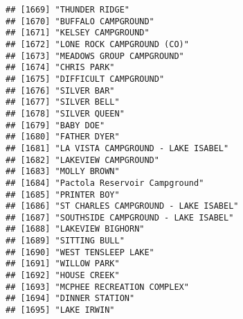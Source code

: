 \documentclass[
]{article}
\begin{document}
\begin{verbatim}
## [1669] "THUNDER RIDGE"                                                                       
## [1670] "BUFFALO CAMPGROUND"                                                                  
## [1671] "KELSEY CAMPGROUND"                                                                   
## [1672] "LONE ROCK CAMPGROUND (CO)"                                                           
## [1673] "MEADOWS GROUP CAMPGROUND"                                                            
## [1674] "CHRIS PARK"                                                                          
## [1675] "DIFFICULT CAMPGROUND"                                                                
## [1676] "SILVER BAR"                                                                          
## [1677] "SILVER BELL"                                                                         
## [1678] "SILVER QUEEN"                                                                        
## [1679] "BABY DOE"                                                                            
## [1680] "FATHER DYER"                                                                         
## [1681] "LA VISTA CAMPGROUND - LAKE ISABEL"                                                   
## [1682] "LAKEVIEW CAMPGROUND"                                                                 
## [1683] "MOLLY BROWN"                                                                         
## [1684] "Pactola Reservoir Campground"                                                        
## [1685] "PRINTER BOY"                                                                         
## [1686] "ST CHARLES CAMPGROUND - LAKE ISABEL"                                                 
## [1687] "SOUTHSIDE CAMPGROUND - LAKE ISABEL"                                                  
## [1688] "LAKEVIEW BIGHORN"                                                                    
## [1689] "SITTING BULL"                                                                        
## [1690] "WEST TENSLEEP LAKE"                                                                  
## [1691] "WILLOW PARK"                                                                         
## [1692] "HOUSE CREEK"                                                                         
## [1693] "MCPHEE RECREATION COMPLEX"                                                           
## [1694] "DINNER STATION"                                                                      
## [1695] "LAKE IRWIN"                                                                          

\end{verbatim}
\end{document}
